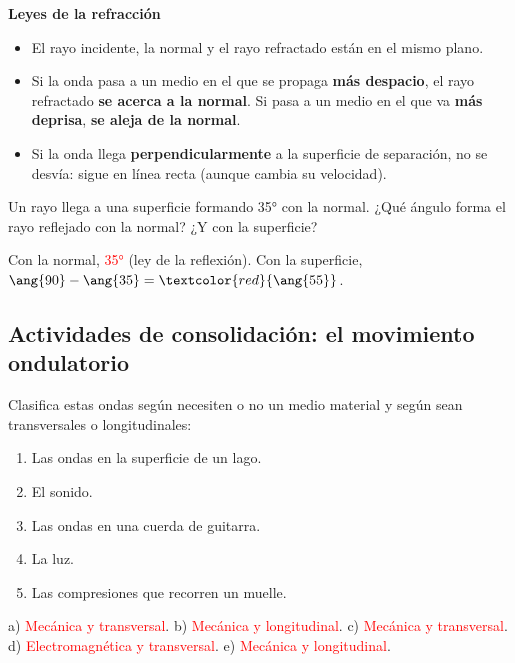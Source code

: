\begin{marker}
    \textbf{Leyes de la refracción}
    \begin{itemize}
        \item El rayo incidente, la normal y el rayo refractado están en el mismo plano.
        \item Si la onda pasa a un medio en el que se propaga \textbf{más despacio}, el rayo refractado \textbf{se acerca a la normal}. Si pasa a un medio en el que va \textbf{más deprisa}, \textbf{se aleja de la normal}.
        \item Si la onda llega \textbf{perpendicularmente} a la superficie de separación, no se desvía: sigue en línea recta (aunque cambia su velocidad).
    \end{itemize}
\end{marker}

\begin{exercise}
    Un rayo llega a una superficie formando \ang{35} con la normal. ¿Qué ángulo forma el rayo reflejado con la normal? ¿Y con la superficie?
    \begin{solu}
        Con la normal, \textcolor{red}{\ang{35}} (ley de la reflexión). Con la superficie, \(\ang{90} - \ang{35} = \textcolor{red}{\ang{55}}\).
    \end{solu}
\end{exercise}

\subsection*{Actividades de consolidación: el movimiento ondulatorio}

\begin{exercise}
    Clasifica estas ondas según necesiten o no un medio material y según sean transversales o longitudinales:
    \begin{enumerate}[label=\alph*)]
        \item Las ondas en la superficie de un lago.
        \item El sonido.
        \item Las ondas en una cuerda de guitarra.
        \item La luz.
        \item Las compresiones que recorren un muelle.
    \end{enumerate}
    \begin{solu}
        a) \textcolor{red}{Mecánica y transversal}. b) \textcolor{red}{Mecánica y longitudinal}. c) \textcolor{red}{Mecánica y transversal}. d) \textcolor{red}{Electromagnética y transversal}. e) \textcolor{red}{Mecánica y longitudinal}.
    \end{solu}
\end{exercise}

